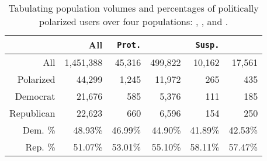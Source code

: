 

\begin{table}[tb]
	\renewcommand{\cellalign}{cr}
	\small
	\setlength{\tabcolsep}{4pt}
	\centering
	\caption{
		Tabulating population volumes and percentages of politically polarized users over four populations: \Protected, \Human, \Suspended and \Bot.
	}
	\begin{tabular}{rrrrrr}
		\toprule
			& All & \texttt{Prot.} & \Human & \texttt{Susp.} & \Bot \\
  		\midrule		
			All & 1,451,388 & 45,316 & 499,822 & 10,162 & 17,561 \\
			Polarized & 44,299 & 1,245 & 11,972 & 265 & 435 \\
			Democrat & 21,676 & 585 & 5,376 & 111 & 185 \\
			Republican & 22,623 & 660 & 6,596 & 154 & 250 \\
		\midrule
			Dem. \% & 48.93\% & 46.99\% & 44.90\% & 41.89\% & 42.53\%\\
			Rep. \% & 51.07\% & 53.01\% & 55.10\% & 58.11\% & 57.47\%\\ 
   		\bottomrule
	\end{tabular}
	\label{tab:populations-effectives}
\end{table}